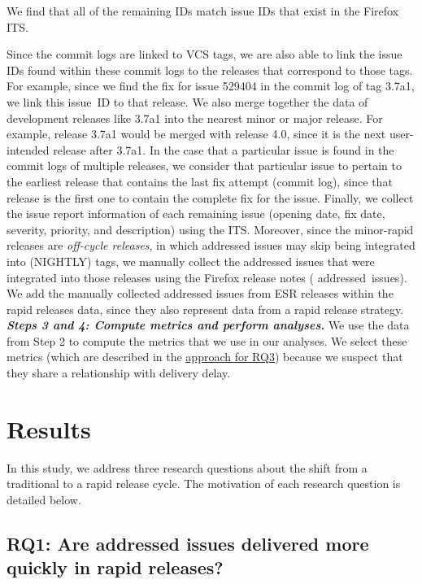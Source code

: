 We find that all of the remaining IDs match issue IDs that exist in the Firefox
ITS.

Since the commit logs are linked to VCS tags, we are also able to link the
issue IDs found within these commit logs to the releases that correspond to
those tags. For example, since we find the fix for issue 529404 in the commit
log of tag 3.7a1, we link this issue~ID to that release. We also merge together
the data of development releases like 3.7a1 into the nearest minor or major
release. For example, release 3.7a1 would be merged with release 4.0, since it
is the next user-intended release after 3.7a1. In the case that a particular
issue is found in the commit logs of multiple releases, we consider that
particular issue to pertain to the earliest release that contains the last fix
attempt (commit log), since that release is the first one to contain the
complete fix for the issue. Finally, we collect the issue report information
of each remaining issue (\eg opening date, fix date, severity, priority, and
description) using the ITS. Moreover, since the minor-rapid releases are
\textit{off-cycle releases}, in which addressed issues may skip being integrated
into  (\ie NIGHTLY) tags, we manually collect the addressed
issues that were integrated into those releases using the Firefox release notes
( addressed~issues).
We add the manually collected addressed issues from ESR releases within the rapid
releases data, since they also represent data from a rapid release strategy.\\

\noindent\textbf{\textit{Steps 3 and 4: Compute metrics and perform analyses.}}
We use the data from Step 2 to compute the metrics that we use in our analyses.
We select these metrics (which are described in the
\hyperref[ch5:rq3]{approach for RQ3}) because we suspect that they
share a relationship with delivery delay.

\section{Results} \label{ch4:results}

In this study, we address three research
questions about the shift from a traditional to a rapid release cycle. The
motivation of each research question is detailed below.

\subsection{RQ1: Are addressed issues delivered more quickly in rapid
releases?}\label{ch5:rq1} 

